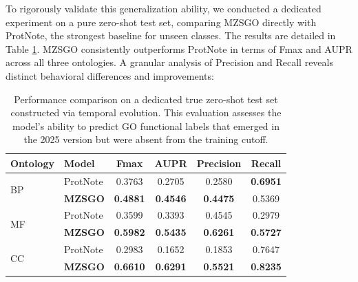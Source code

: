 \documentclass[unnumsec,webpdf,contemporary,large]{oup-authoring-template}%
\theoremstyle{thmstyleone}%
\theoremstyle{thmstyletwo}%
\theoremstyle{thmstylethree}%
\begin{document}
To rigorously validate this generalization ability, we conducted a dedicated experiment on a pure zero-shot test set, comparing MZSGO directly with ProtNote, the strongest baseline for unseen classes. The results are detailed in Table \ref{tab:comparison_zeroshot}. MZSGO consistently outperforms ProtNote in terms of Fmax and AUPR across all three ontologies. A granular analysis of Precision and Recall reveals distinct behavioral differences and improvements:

\begin{table}[htbp]
\centering
\caption{Performance comparison on a dedicated true zero-shot test set constructed via temporal evolution. This evaluation assesses the model's ability to predict GO functional labels that emerged in the 2025 version but were absent from the training cutoff.}
\label{tab:comparison_zeroshot}
\begin{tabular}{llcccc}
\toprule
\textbf{Ontology} & \textbf{Model} & \textbf{Fmax} & \textbf{AUPR} & \textbf{Precision} & \textbf{Recall} \\
\midrule
\multirow{2}{*}{BP} 
 & ProtNote  & 0.3763 & 0.2705 & 0.2580 & \textbf{0.6951} \\
 & \textbf{MZSGO} & \textbf{0.4881} & \textbf{0.4546} & \textbf{0.4475} & 0.5369 \\
\midrule
\multirow{2}{*}{MF} 
 & ProtNote & 0.3599 & 0.3393 & 0.4545 & 0.2979 \\
 & \textbf{MZSGO} & \textbf{0.5982} & \textbf{0.5435} & \textbf{0.6261} & \textbf{0.5727} \\
\midrule
\multirow{2}{*}{CC} 
 & ProtNote & 0.2983 & 0.1652 & 0.1853 & 0.7647 \\
 & \textbf{MZSGO} & \textbf{0.6610} & \textbf{0.6291} & \textbf{0.5521} & \textbf{0.8235} \\
\bottomrule
\end{tabular}
\end{table}
\end{document}
